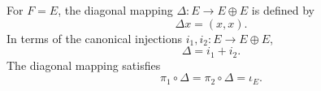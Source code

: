 For $F = E$, the diagonal mapping $\Delta: E \to E \oplus E$ is defined by
$$\Delta x = (x, x).$$
In terms of the canonical injections $i_1, i_2: E \to E \oplus E$,
$$\Delta = i_1 + i_2.$$
The diagonal mapping satisfies
$$\pi_1 \circ \Delta = \pi_2 \circ \Delta = \iota_E.$$
